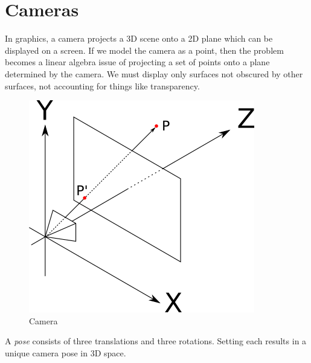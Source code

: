 \section{Cameras}

In graphics, a camera projects a 3D scene onto a 2D plane which
can be displayed on a screen. If we model the camera as a point,
then the problem becomes a linear algebra issue of projecting a
set of points onto a plane determined by the camera. We must
display only surfaces not obscured by other surfaces, not accounting
for things like transparency.

\begin{figure}
    \includegraphics{images/camera.png}
    \caption{Camera}
    \label{fig:camera}
\end{figure}

A \emph{pose} consists of three translations and three rotations.
Setting each results in a unique camera pose in 3D space.

